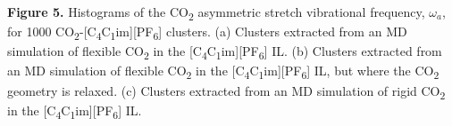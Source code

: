 \documentclass[]{article}
\begin{document}

\textbf{Figure 5.} Histograms of the CO\textsubscript{2} asymmetric stretch vibrational frequency, \(\omega_{a}\), for 1000 CO\textsubscript{2}-{[}C\textsubscript{4}C\textsubscript{1}im{]}{[}PF\textsubscript{6}{]} clusters. (a) Clusters extracted from an MD simulation of flexible CO\textsubscript{2} in the {[}C\textsubscript{4}C\textsubscript{1}im{]}{[}PF\textsubscript{6}{]} IL. (b) Clusters extracted from an MD simulation of flexible CO\textsubscript{2} in the {[}C\textsubscript{4}C\textsubscript{1}im{]}{[}PF\textsubscript{6}{]} IL, but where the CO\textsubscript{2} geometry is relaxed. (c) Clusters extracted from an MD simulation of rigid CO\textsubscript{2} in the {[}C\textsubscript{4}C\textsubscript{1}im{]}{[}PF\textsubscript{6}{]} IL.
\end{document}

